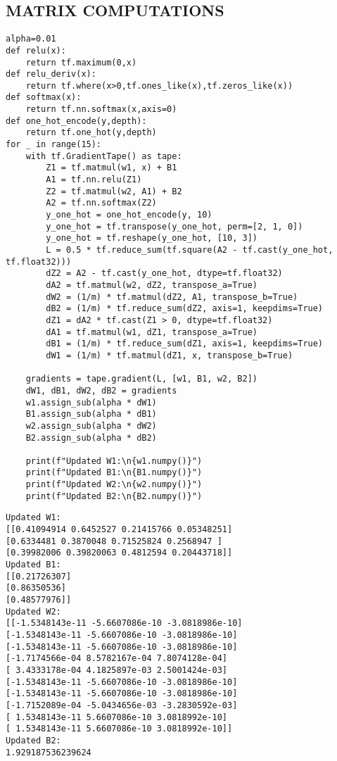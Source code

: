 \subsection{MATRIX COMPUTATIONS}

\begin{lstlisting}
alpha=0.01
def relu(x):
    return tf.maximum(0,x)
def relu_deriv(x):
    return tf.where(x>0,tf.ones_like(x),tf.zeros_like(x))
def softmax(x):
    return tf.nn.softmax(x,axis=0)
def one_hot_encode(y,depth):
    return tf.one_hot(y,depth)
for _ in range(15):
    with tf.GradientTape() as tape:
        Z1 = tf.matmul(w1, x) + B1
        A1 = tf.nn.relu(Z1)
        Z2 = tf.matmul(w2, A1) + B2
        A2 = tf.nn.softmax(Z2)
        y_one_hot = one_hot_encode(y, 10)
        y_one_hot = tf.transpose(y_one_hot, perm=[2, 1, 0])
        y_one_hot = tf.reshape(y_one_hot, [10, 3])
        L = 0.5 * tf.reduce_sum(tf.square(A2 - tf.cast(y_one_hot, tf.float32)))
        dZ2 = A2 - tf.cast(y_one_hot, dtype=tf.float32)
        dA2 = tf.matmul(w2, dZ2, transpose_a=True)
        dW2 = (1/m) * tf.matmul(dZ2, A1, transpose_b=True)
        dB2 = (1/m) * tf.reduce_sum(dZ2, axis=1, keepdims=True)
        dZ1 = dA2 * tf.cast(Z1 > 0, dtype=tf.float32)
        dA1 = tf.matmul(w1, dZ1, transpose_a=True)
        dB1 = (1/m) * tf.reduce_sum(dZ1, axis=1, keepdims=True)
        dW1 = (1/m) * tf.matmul(dZ1, x, transpose_b=True)

    gradients = tape.gradient(L, [w1, B1, w2, B2])
    dW1, dB1, dW2, dB2 = gradients
    w1.assign_sub(alpha * dW1)
    B1.assign_sub(alpha * dB1)
    w2.assign_sub(alpha * dW2)
    B2.assign_sub(alpha * dB2)

    print(f"Updated W1:\n{w1.numpy()}")
    print(f"Updated B1:\n{B1.numpy()}")
    print(f"Updated W2:\n{w2.numpy()}")
    print(f"Updated B2:\n{B2.numpy()}")
\end{lstlisting}
\newpage
\begin{verbatim}
Updated W1:
[[0.41094914 0.6452527 0.21415766 0.05348251]
[0.6334481 0.3870048 0.71525824 0.2568947 ]
[0.39982006 0.39820063 0.4812594 0.20443718]]
Updated B1:
[[0.21726307]
[0.86350536]
[0.48577976]]
Updated W2:
[[-1.5348143e-11 -5.6607086e-10 -3.0818986e-10]
[-1.5348143e-11 -5.6607086e-10 -3.0818986e-10]
[-1.5348143e-11 -5.6607086e-10 -3.0818986e-10]
[-1.7174566e-04 8.5782167e-04 7.8074128e-04]
[ 3.4333178e-04 4.1825897e-03 2.5001424e-03]
[-1.5348143e-11 -5.6607086e-10 -3.0818986e-10]
[-1.5348143e-11 -5.6607086e-10 -3.0818986e-10]
[-1.7152089e-04 -5.0434656e-03 -3.2830592e-03]
[ 1.5348143e-11 5.6607086e-10 3.0818992e-10]
[ 1.5348143e-11 5.6607086e-10 3.0818992e-10]]
Updated B2:
1.929187536239624

\end{verbatim}